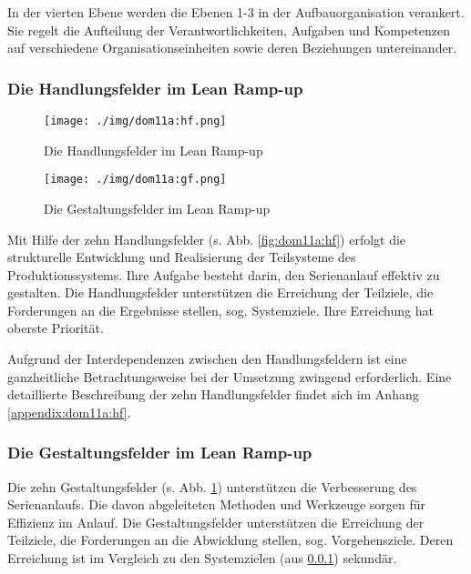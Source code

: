 In der vierten Ebene werden die Ebenen 1-3 in der Aufbauorganisation verankert. Sie regelt die Aufteilung der Verantwortlichkeiten, Aufgaben und Kompetenzen auf verschiedene Organisationseinheiten sowie deren Beziehungen untereinander. 
\subsubsection{Die Handlungsfelder im Lean Ramp-up}\label{sec:dom11a:hf}
\begin{figure}[!ht] 
    \begin{minipage}{0.45\linewidth} 
    \begin{center}
 \texttt{[image: ./img/dom11a:hf.png]}
 \caption[Die Handlungsfelder im Lean Ramp-up]{Die Handlungsfelder im Lean Ramp-up \autocite{Dombrowski2011a}}\label{fig:dom11a:hf}
\end{center}
    \end{minipage} 
    \hfill 
    \begin{minipage}{0.5\linewidth} 
 \texttt{[image: ./img/dom11a:gf.png]}
 \caption[Die Gestaltungsfelder im Lean Ramp-up]{Die Gestaltungsfelder im Lean Ramp-up\autocite{Dombrowski2011a}}\label{fig:dom11a:gf}
    \end{minipage} 
  \end{figure} 

Mit Hilfe der zehn Handlungsfelder (s. Abb. \ref{fig:dom11a:hf}) erfolgt die strukturelle Entwicklung und Realisierung der Teilsysteme des Produktionssystems. Ihre Aufgabe besteht darin, den Serienanlauf effektiv zu gestalten. Die Handlungsfelder unterstützen die Erreichung der Teilziele, die Forderungen an die Ergebnisse stellen, sog. Systemziele. Ihre Erreichung hat oberste Priorität. 

Aufgrund der Interdependenzen zwischen den Handlungsfeldern ist eine ganzheitliche Betrachtungsweise bei der Umsetzung zwingend erforderlich. 
Eine detaillierte Beschreibung der zehn Handlungsfelder findet sich im Anhang \ref{appendix:dom11a:hf}. 

  
\subsubsection{Die Gestaltungsfelder im Lean Ramp-up}\label{sec:dom11a:gf}
Die zehn Gestaltungsfelder (s. Abb. \ref{fig:dom11a:gf}) unterstützen die Verbesserung des Serienanlaufs. Die davon abgeleiteten Methoden und Werkzeuge sorgen für Effizienz im Anlauf. Die Gestaltungsfelder unterstützen die Erreichung der Teilziele, die Forderungen an die Abwicklung stellen, sog. Vorgehensziele. Deren Erreichung ist im Vergleich zu den Systemzielen (aus \ref{sec:dom11a:hf}) sekundär. 

